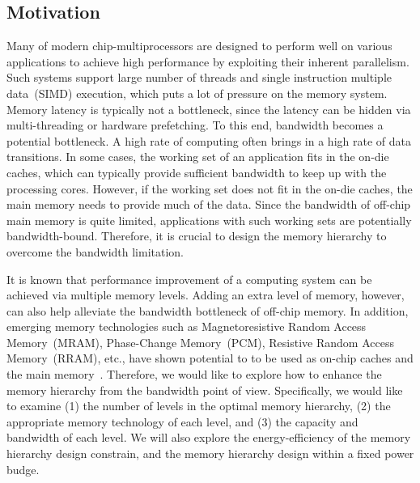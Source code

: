 \documentclass[12pt,letterpaper, singlecolumn]{article}
\begin{document}
\begin{large}

\section{Motivation}

Many of modern chip-multiprocessors are designed to perform well on various
applications to achieve high performance by exploiting their inherent
parallelism. Such systems support large number of threads and single instruction
multiple data~(SIMD) execution, which puts a lot of pressure on the memory
system. Memory latency is typically not a bottleneck, since the latency can be
hidden via multi-threading or hardware prefetching. To this end, bandwidth becomes a
potential bottleneck. A high rate of computing often brings in a high rate of
data transitions. In some cases, the working set of an application fits in the
on-die caches, which can typically provide sufficient bandwidth to keep up with
the processing cores. However, if the working set does not fit in the on-die
caches, the main memory needs to provide much of the data. Since the bandwidth
of off-chip main memory is quite limited, applications with such working sets
are potentially bandwidth-bound. Therefore, it is crucial to design the memory
hierarchy to overcome the bandwidth limitation. 

It is known that performance improvement of a computing system can be achieved
via multiple memory levels. Adding an extra level of memory, however, can also
help alleviate the bandwidth bottleneck of off-chip memory. In addition,
emerging memory technologies such as Magnetoresistive Random Access
Memory~(MRAM), Phase-Change Memory~(PCM), Resistive Random Access Memory~(RRAM),
etc., have shown potential to to be used as on-chip caches and the main
memory~\cite{Sun:2009:MRAM-L2-CMP}. Therefore, we would like to explore how to
enhance the memory hierarchy from the bandwidth point of view. Specifically, we
would like to examine (1) the number of levels in the optimal memory hierarchy,
(2) the appropriate memory technology of each level, and (3) the capacity and
bandwidth of each level. We will also explore the energy-efficiency of the
memory hierarchy design constrain, and the memory hierarchy design within a
fixed power budge.\vspace{0.15in}



\end{large}
\end{document}
